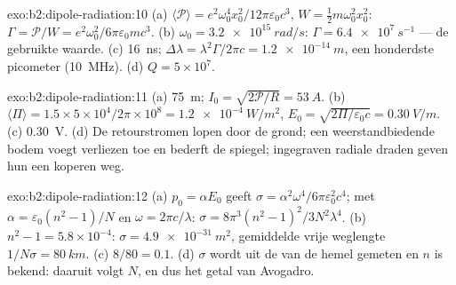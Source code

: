 \begin{solution}{exo:b2:dipole-radiation:10}
(a) $\langle\mathcal P\rangle = e^2\omega_0^4x_0^2/12\pi\varepsilon_0c^3$,
$W = \tfrac12m\omega_0^2x_0^2$:
$\Gamma = \mathcal P/W = e^2\omega_0^2/6\pi\varepsilon_0mc^3$. (b)
$\omega_0 = \qty{3.2e15}{rad/s}$: $\Gamma =
\qty{6.4e7}{s^{-1}}$ --- de
gebruikte waarde. (c) \qty{16}{ns};
$\Delta\lambda = \lambda^2\Gamma/2\pi c =
\qty{1.2e-14}{m}$, een honderdste
picometer (\qty{10}{MHz}). (d) $Q = 5 \times 10^7$.
\end{solution}

\begin{solution}{exo:b2:dipole-radiation:11}
(a) \qty{75}{m}; $I_0 = \sqrt{2\mathcal P/R} = \qty{53}{A}$. (b)
$\langle\Pi\rangle = 1.5 \times
5 \times 10^4/2\pi \times 10^8 = \qty{1.2e-4}{W/m^2}$,
$E_0 = \sqrt{2\Pi/\varepsilon_0c} = \qty{0.30}{V/m}$. (c) \qty{0.30}{V}. (d)
De retourstromen lopen door de grond; een weerstandbiedende bodem voegt
verliezen toe en bederft de spiegel; ingegraven radiale draden geven hun een
koperen weg.
\end{solution}

\begin{solution}{exo:b2:dipole-radiation:12}
(a) $p_0 = \alpha E_0$ geeft
$\sigma = \alpha^2\omega^4/6\pi\varepsilon_0^2c^4$; met
$\alpha = \varepsilon_0(n^2
- 1)/N$ en $\omega = 2\pi c/\lambda$:
$\sigma = 8\pi^3(n^2 - 1)^2/3N^2\lambda^4$. (b)
$n^2 - 1 =
5.8 \times 10^{-4}$: $\sigma = \qty{4.9e-31}{m^2}$, gemiddelde
vrije weglengte $1/N\sigma = \qty{80}{km}$. (c) $8/80 = 0.1$. (d) $\sigma$
wordt uit de  van de hemel gemeten en $n$ is bekend: daaruit
volgt $N$, en dus het getal van Avogadro.
\end{solution}

